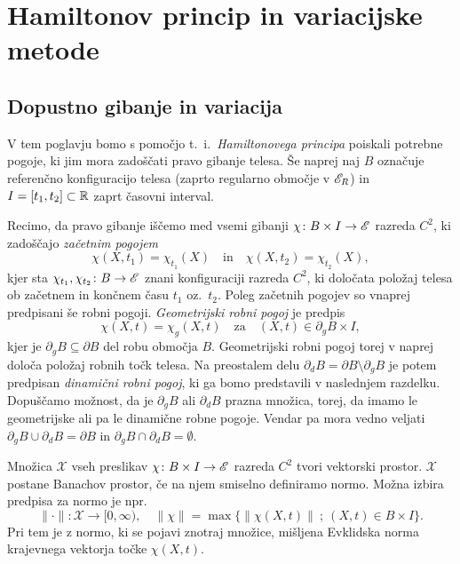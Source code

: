 \chapter{Hamiltonov princip in variacijske metode}


\section{Dopustno gibanje in variacija}


V tem poglavju bomo s pomočjo t.~i.~\emph{Hamiltonovega principa} poiskali potrebne pogoje,
ki jim mora zadoščati pravo gibanje telesa. Še naprej naj $B$ označuje referenčno konfiguracijo
telesa (zaprto regularno območje v $\mathscr E_R$) in $I=[t_1,t_2]\subset\mathbb R$ zaprt časovni interval.

Recimo, da pravo gibanje iščemo med vsemi gibanji
$\chi\colon B\times I\to\mathscr E$ razreda $C^2$, ki zadoščajo \emph{začetnim pogojem}
\[ \chi(X,t_1)=\chi_{t_1}(X)\quad\textrm{in}\quad \chi(X,t_2)=\chi_{t_2}(X), \]
kjer sta $\chi_{t_1},\chi_{t_2}\colon B\to\mathscr E$ znani konfiguraciji razreda $C^2$, ki
določata položaj telesa ob začetnem in končnem času $t_1$ oz.~$t_2$.
Poleg začetnih pogojev so vnaprej predpisani še robni pogoji. \emph{Geometrijski robni pogoj} je predpis
\begin{equation*} \label{e:grp}
	\chi(X,t)=\chi_g(X,t)\quad\mathrm{za}\quad (X,t)\in \partial_g B\times I,
\end{equation*}
kjer je $\partial_g B\subseteq\partial B$ del robu območja $B$.
Geometrijski robni pogoj torej v naprej določa položaj robnih točk telesa.
Na preostalem delu $\partial_d B=\partial B \setminus \partial_g B$
je potem predpisan \emph{dinamični robni pogoj}, ki ga bomo predstavili v naslednjem razdelku.
Dopuščamo možnost, da je $\partial_g B$ ali $\partial_d B$ prazna množica, torej,
da imamo le geometrijske ali pa le dinamične robne pogoje. Vendar pa mora vedno veljati
$\partial_g B\cup\partial_d B=\partial B$ in $\partial_g B\cap\partial_d B=\emptyset$.

Množica $\mathcal{X}$ vseh preslikav $\chi\colon B\times I\to\mathscr E$
razreda $C^2$ tvori vektorski prostor.
$\mathcal{X}$ postane Banachov prostor, če na njem smiselno definiramo normo. Možna izbira
predpisa za normo je npr.
\[
	\|\cdot\|\colon\mathcal{X}\to[0,\infty),\quad
	\|\chi\|=\max\big\{\|\chi(X,t)\|\: ;\ (X,t)\in B\times I\big\}.
\]
Pri tem je z normo, ki se pojavi znotraj množice, mišljena Evklidska norma krajevnega vektorja točke $\chi(X,t)$.

